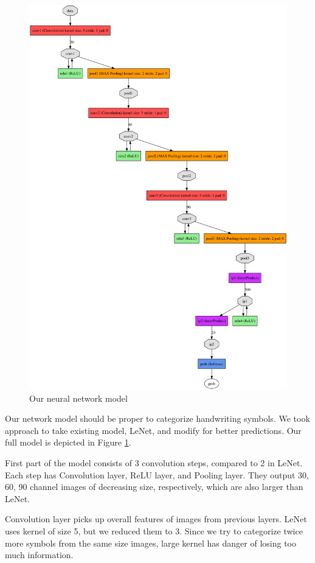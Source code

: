 \documentclass[10pt,twocolumn,letterpaper]{article}
\begin{document}
\begin{figure}[t]
\centering
\includegraphics[width=0.9\linewidth]{img/model.png}
\caption{Our neural network model}
\label{fig:model}
\end{figure}

Our network model should be proper to categorize handwriting symbols.
We took approach to take existing model, LeNet, and modify for better predictions.
Our full model is depicted in Figure \ref{fig:model}.

First part of the model consists of 3 convolution steps, compared to 2 in LeNet.
Each step has Convolution layer, ReLU layer, and Pooling layer.
They output 30, 60, 90 channel images of decreasing size, respectively, which are also larger than LeNet.

Convolution layer picks up overall features of images from previous layers.
LeNet uses kernel of size 5, but we reduced them to 3.
Since we try to categorize twice more symbols from the same size images, large kernel has danger of losing too much information. 
\end{document}
